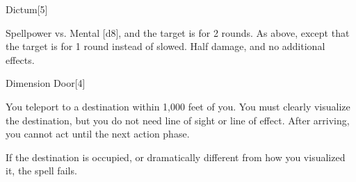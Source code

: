 \begin{spellsection}{Dictum}[5]
    \begin{spellheader}
    \end{spellheader}
    \begin{spellcontent}
        \begin{spelltargetinginfo}
        \end{spelltargetinginfo}
        \begin{spelleffects}
            \begin{spellattack}{Spellpower vs. Mental}
                \spellsuccess {}[d8], and the target is \immobilized for 2 rounds.
                \spellcritical As above, except that the target is \stunned for 1 round instead of slowed.
                \spellfailure Half damage, and no additional effects.
            \end{spellattack}
        \end{spelleffects}
    \end{spellcontent}
    \begin{spellfooter}
        \miscastexplode
    \end{spellfooter}
\end{spellsection}

\begin{spellsection}{Dimension Door}[4]
    \begin{spellheader}
    \end{spellheader}
    \begin{spellcontent}
        \begin{spelltargetinginfo}
        \end{spelltargetinginfo}
        \begin{spelleffects}
            \spelleffect You teleport to a destination within 1,000 feet of you. You must clearly visualize the destination, but you do not need line of sight or line of effect. After arriving, you cannot act until the next action phase.

            If the destination is occupied, or dramatically different from how you visualized it, the spell fails.
        \end{spelleffects}
    \end{spellcontent}
    \begin{spellfooter}
        \miscastexplode
    \end{spellfooter}
    \begin{spellaugments}
    \end{spellaugments}
\end{spellsection}

